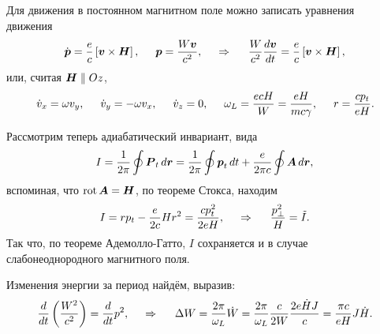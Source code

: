 
Для движения в постоянном магнитном поле можно записать уравнения движения
\begin{equation*}
    \dot{\mbox{\boldmath $p$}} = \frac{e}{c} \left[\mbox{\boldmath $v$} \times  \mbox{\boldmath $H$}\right], \hspace{5 mm} 
    \mbox{\boldmath $p$} = \frac{W \mbox{\boldmath $v$}}{c^2}, \hspace{0.5cm} \Rightarrow \hspace{0.5cm}
    \frac{W}{c^2} \frac{d \mbox{\boldmath $v$}}{d t} = \frac{e}{c} \left[\mbox{\boldmath $v$} \times \mbox{\boldmath $H$}\right],
\end{equation*}
или, считая $\mbox{\boldmath $H$} \parallel Oz$, 
\begin{equation*}
    \dot{v}_x = \omega v_y, \hspace{5 mm} 
    \dot{v}_y = - \omega v_x, \hspace{5 mm} 
    \dot{v}_z = 0,
    \hspace{5 mm} 
    \omega_L = \frac{e c H}{W} = \frac{e H}{m c \gamma},
    \hspace{5 mm} 
    r = \frac{c p_t}{e H}.
\end{equation*}

Рассмотрим теперь адиабатический инвариант, вида
\begin{equation*}
    I = \frac{1}{2\pi} \oint \mbox{\boldmath $P$}_t \, d \mbox{\boldmath $r$} = \frac{1}{2\pi} \oint \mbox{\boldmath $p$}_t \, d t + \frac{e}{2\pi c} \oint \mbox{\boldmath $A$} \, d \mbox{\boldmath $r$},
\end{equation*}
вспоминая, что $\mathop{\mathrm{rot}}\nolimits \mbox{\boldmath $A$} = \mbox{\boldmath $H$}$, по теореме Стокса, находим
\begin{equation*}
    I = r p_t - \frac{e}{2c} H r^2 = \frac{c p_t^2}{2 e H},
    \hspace{0.5cm} \Rightarrow \hspace{0.5cm}
    \frac{p_\bot^2}{H} = \tilde{I}.
\end{equation*}
Так что, по теореме Адемолло-Гатто, $I$ сохраняется и в случае слабонеоднородного магнитного поля. 


Изменения энергии за период найдём, выразив:
\begin{equation*}
    \frac{d }{d t} \left(\frac{W^2}{c^2}\right) = \frac{d }{d t} p^2,
    \hspace{0.5cm} \Rightarrow \hspace{0.5cm}
    \Delta W = \frac{2 \pi}{\omega_L} \dot{W} = \frac{2 \pi}{\omega_L} \frac{c}{2W} \frac{2 e \dot{H} J}{c} = \frac{\pi c}{e H} J \dot{H}.
\end{equation*}

